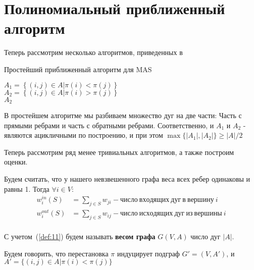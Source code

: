 
\section{Полиномиальный приближенный алгоритм}

Теперь рассмотрим несколько алгоритмов, приведенных в~\cite{rnd_alg}

\begin{algorithm}
    \caption{Простейший приближенный алгоритм для MAS}\label{alg:3}
   
        $A_1 = \left\{(i, j) \in A | \pi(i) < \pi(j)\right\}$ \\
        $A_2 = \left\{(i, j) \in A | \pi(i) > \pi(j)\right\}$ \\
        \Return $A_2$
\end{algorithm}

В простейшем алгоритме мы разбиваем множество дуг на две части: Часть с прямыми
ребрами и часть с обратными ребрами. Соответственно, и $A_1$ и $A_2$ - являются
ацикличными по построению, и при этом $\max\{|A_1|, |A_2|\} \geq |A| / 2$

Теперь рассмотрим ряд менее тривиальных алгоритмов, а также построим оценки.

\begin{definition}\label{def:11}
    Будем считать, что у нашего невзвешенного графа веса всех ребер 
    одинаковы и равны 1. Тогда $\forall i \in V:$ \\
    \begin{align*}
        w_i^{in}(S) &= \sum\limits_{j\in S}w_{ji} - число~входящих~дуг~
        в~вершину~i\\
        w_i^{out}(S) &= \sum\limits_{j\in S}w_{ij} - число~исходящих~дуг~из~
        вершины~i\\
    \end{align*}
\end{definition}

\begin{definition}
    С учетом~(\ref{def:11}) будем называть \textbf{весом графа} $G(V, A)$ число
    дуг $|A|$.
\end{definition}

\begin{definition}
    Будем говорить, что перестановка $\pi$ индуцирует подграф $G'=(V, A')$, 
    и $A'=\{(i, j) \in A | \pi(i) < \pi(j)\}$
\end{definition}

